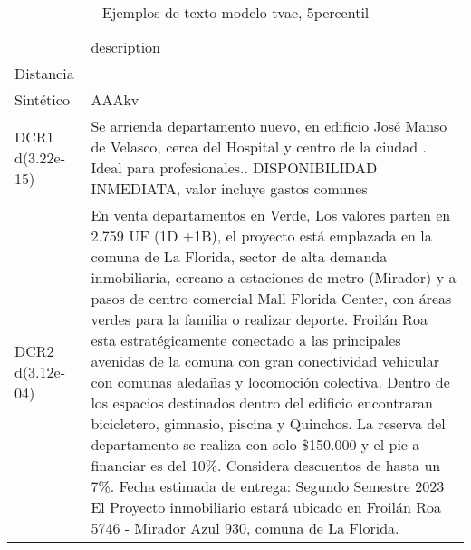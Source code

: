 \begin{table}[H]
\centering
\fontsize{10}{14}\selectfont
\caption{Ejemplos de texto modelo tvae, 5percentil}
\label{table-example-economicos-b-2-tvae-5p-text}
\begin{tabular}{|l|m{35em}|}
\hline
\rowcolor[gray]{0.8}
 & description \\
Distancia &  \\
\hline Sintético & AAAkv \\
\hline DCR1 d(3.22e-15) & Se arrienda departamento nuevo, en edificio Jos\'e Manso de Velasco, cerca del Hospital y centro de la ciudad . Ideal para profesionales.. DISPONIBILIDAD INMEDIATA, valor incluye gastos comunes  \\
\hline DCR2 d(3.12e-04) & En venta departamentos en Verde, Los valores parten en 2.759 UF (1D +1B), el proyecto est\'a emplazada en la comuna de La Florida, sector de alta demanda inmobiliaria, cercano a estaciones de metro (Mirador) y a pasos de centro comercial Mall Florida Center, con \'areas verdes para la familia o realizar deporte. Froil\'an Roa esta estrat\'egicamente conectado a las principales avenidas de la comuna con gran conectividad vehicular con comunas aleda\~nas y locomoci\'on colectiva. Dentro de los espacios destinados dentro del edificio encontraran bicicletero, gimnasio, piscina y Quinchos.
La reserva del departamento se realiza con solo \$150.000 y el pie a financiar es del 10\%. Considera descuentos de hasta un 7\%.
Fecha estimada de entrega: Segundo Semestre 2023
El Proyecto inmobiliario estar\'a ubicado en Froil\'an Roa 5746 - Mirador Azul 930,  comuna de La Florida. \\
\hline
\end{tabular}
\end{table}
